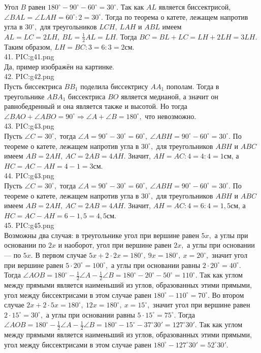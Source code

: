 Угол $B$ равен $180^\circ-90^\circ-60^\circ=30^\circ.$ Так как $AL$ является биссектрисой, $\angle BAL= \angle LAH=60^\circ:2=30^\circ.$ Тогда по теорема о катете, лежащем напротив угла в $30^\circ,$ для треугольников $LCH,\ LAH$ и $ABL$ имеем $AL=LC=2LH,\ BL=\frac{1}{2}AL=LH.$ Тогда $BC=BL+LC=LH+2LH=3LH.$ Таким образом, $LH=BC:3=6:3=2$см.\\
41. {{PIC:g41.png}}\\
Да, пример изображён на картинке.\\
42. {{PIC:g42.png}}\\
Пусть биссектриса $BB_1$ поделила биссектрису $AA_1$ пополам. Тогда в треугольнике $ABA_1$ биссектриса $BO$ является медианой, а значит он равнобедренный и она является также и высотой. Но тогда $\angle BAO+\angle ABO=90^\circ\Rightarrow \angle A+\angle B=180^\circ,$ что невозможно.\\
43. {{PIC:g43.png}}\\
Пусть $\angle C=30^\circ,$ тогда $\angle A=90^\circ-30^\circ=60^\circ,\ \angle ABH=90^\circ-60^\circ=30^\circ.$ По теореме о катете, лежащем напротив угла в $30^\circ,$ для треугольников $ABH$ и $ABC$ имеем $AB=2AH,\ AC=2AB=4AH.$ Значит, $AH=AC:4=4:4=1$см, а $HC=AC-AH=4-1=3$см.\\
44. {{PIC:g43.png}}\\
Пусть $\angle C=30^\circ,$ тогда $\angle A=90^\circ-30^\circ=60^\circ,\ \angle ABH=90^\circ-60^\circ=30^\circ.$ По теореме о катете, лежащем напротив угла в $30^\circ,$ для треугольников $ABH$ и $ABC$ имеем $AB=2AH,\ AC=2AB=4AH.$ Значит, $AH=AC:4=6:4=1,5$см, а $HC=AC-AH=6-1,5=4,5$см.\\
45. {{PIC:g45.png}}\\
Возможны два случая: в треугольнике угол при вершине равен $5x,$ а углы при основании по $2x$ и наоборот, угол при вершине равен $2x,$ а углы при основании --- по $5x.$ В первом случае $5x+2\cdot2x=180^\circ,\ 9x=180^\circ,\ x=20^\circ,$ значит угол при вершине равен $5\cdot20^\circ=100^\circ,$ а углы при основании равны $2\cdot20^\circ=40^\circ.$ Тогда $\angle AOB=180^\circ-\frac{1}{2}\angle A-\frac{1}{2}\angle B=180^\circ-20^\circ-50^\circ=110^\circ.$ Так как углом между прямыми является наименьший из углов, образованных этими прямыми, угол между биссектрисами в этом случае равен $180^\circ-110^\circ=70^\circ.$ Во втором случае $2x+2\cdot5x=180^\circ,\ 12x=180^\circ,\ x=15^\circ,$ значит угол при вершине равен $2\cdot15^\circ=30^\circ,$ а углы при основании равны $5\cdot15^\circ=75^\circ.$
Тогда $\angle AOB=180^\circ-\frac{1}{2}\angle A-\frac{1}{2}\angle B=180^\circ-15^\circ-37^\circ30'=127^\circ30'.$ Так как углом между прямыми является наименьший из углов, образованных этими прямыми, угол между биссектрисами в этом случае равен $180^\circ-127^\circ30'=52^\circ30'.$\newpage
